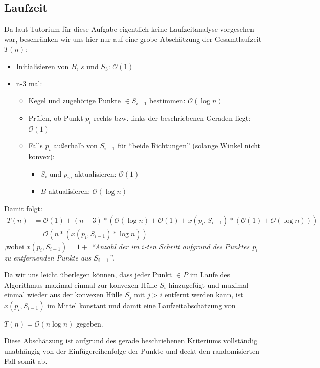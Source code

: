 \documentclass[a4paper]{article}
\begin{document}
\subsection*{Laufzeit}
Da laut Tutorium für diese Aufgabe eigentlich keine Laufzeitanalyse vorgesehen war, beschränken wir uns hier nur auf eine grobe Abschätzung
der Gesamtlaufzeit $T(n)$:

\begin{itemize}
 \item Initialisieren von $B$, $s$ und $S_3$: $\mathcal{O}(1)$
 \item n-3 mal:
 \begin{itemize}
  \item Kegel und zugehörige Punkte $\in S_{i-1}$ bestimmen: $\mathcal{O}(\log n)$
  \item Prüfen, ob Punkt $p_i$ rechts bzw. links der beschriebenen Geraden liegt: $\mathcal{O}(1)$
  \item Falls $p_i$ außerhalb von $S_{i-1}$ für "`beide Richtungen"' (solange
  Winkel nicht konvex):
  \begin{itemize}
    \item $S_i$ und $p_m$ aktualisieren: $\mathcal{O}(1)$ 
    \item $B$ aktualisieren: $\mathcal{O}(\log n)$
  \end{itemize}

 \end{itemize}

\end{itemize}

Damit folgt: 
\begin{align*}
T(n) &= \mathcal{O}(1) + (n-3) * (\mathcal{O}(\log n) + \mathcal{O}(1) + x(p_i,S_{i-1}) * ( 
\mathcal{O}(1) + \mathcal{O}(\log n)))\\
&= \mathcal{O}(n * ( x(p_i, S_{i-1}) * \log n) )
\end{align*}
,wobei $x(p_i, S_{i-1}) = 1 + $ \textit{"`Anzahl der im $i$-ten Schritt
aufgrund des Punktes $p_i$ zu entfernenden Punkte aus $S_{i-1}$"'}.

Da wir uns leicht überlegen können, dass jeder Punkt $\in P$ 
im Laufe des Algorithmus maximal einmal 
zur konvexen Hülle $S_i$ hinzugefügt und maximal einmal wieder aus der konvexen Hülle $S_j$ mit
$j > i$ entfernt werden kann, ist $x(p_i, S_{i-1})$ im Mittel konstant 
und damit
eine Laufzeitabschätzung von 

$T(n) = \mathcal{O}(n \log n)$ gegeben.

Diese Abschätzung ist aufgrund des gerade beschriebenen Kriteriums vollständig unabhängig
von der Einfügereihenfolge der Punkte und deckt den randomisierten Fall somit ab.
\end{document}

